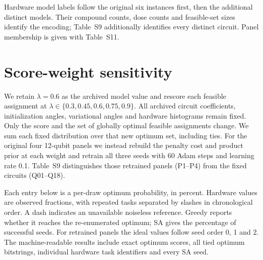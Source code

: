 Hardware model labels follow the original six instances first, then the additional distinct models. Their compound counts, dose counts and feasible-set sizes identify the encoding; Table~S9 additionally identifies every distinct circuit. Panel membership is given with Table~S11.

\clearpage
\section{Score-weight sensitivity}
We retain $\lambda=0.6$ as the archived model value and rescore each feasible assignment at $\lambda\in\{0.3,0.45,0.6,0.75,0.9\}$. All archived circuit coefficients, initialization angles, variational angles and hardware histograms remain fixed. Only the score and the set of globally optimal feasible assignments change. We sum each fixed distribution over that new optimum set, including ties. For the original four 12-qubit panels we instead rebuild the penalty cost and product prior at each weight and retrain all three seeds with 60 Adam steps and learning rate 0.1. Table~S9 distinguishes those retrained panels (P1--P4) from the fixed circuits (Q01--Q18).

Each entry below is a per-draw optimum probability, in percent. Hardware values are observed fractions, with repeated tasks separated by slashes in chronological order. A dash indicates an unavailable noiseless reference. Greedy reports whether it reaches the re-enumerated optimum; SA gives the percentage of successful seeds. For retrained panels the ideal values follow seed order 0, 1 and 2. The machine-readable results include exact optimum scores, all tied optimum bitstrings, individual hardware task identifiers and every SA seed.

